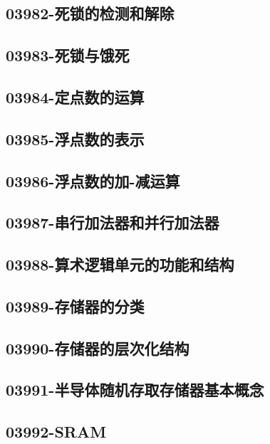 \subsection{03982-死锁的检测和解除}

\subsection{03983-死锁与饿死}

\subsection{03984-定点数的运算}

\subsection{03985-浮点数的表示}

\subsection{03986-浮点数的加-减运算}

\subsection{03987-串行加法器和并行加法器}

\subsection{03988-算术逻辑单元的功能和结构}

\subsection{03989-存储器的分类}

\subsection{03990-存储器的层次化结构}

\subsection{03991-半导体随机存取存储器基本概念}

\subsection{03992-SRAM}

